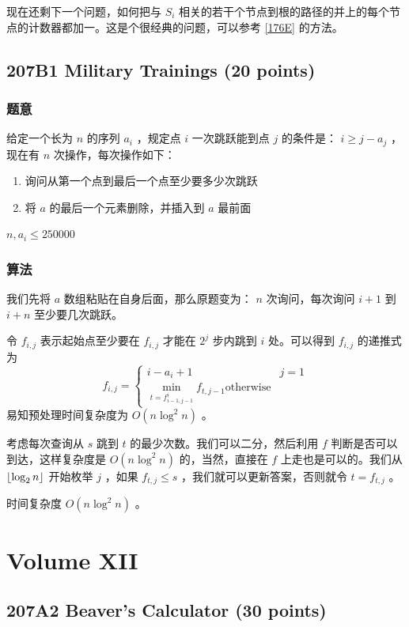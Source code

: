 \documentclass[11pt]{article}
\begin{document}
    现在还剩下一个问题，如何把与 $S_i$ 相关的若干个节点到根的路径的并上的每个节点的计数器都加一。这是个很经典的问题，可以参考 \ref{176E} 的方法。
\subsection{207B1 Military Trainings (20 points)}
\label{sec-11-9}
\subsubsection{题意}
\label{sec-11-9-1}

给定一个长为 $n$ 的序列 $a_i$ ，规定点 $i$ 一次跳跃能到点 $j$ 的条件是： $i \geq j - a_j$ ，现在有 $n$ 次操作，每次操作如下：
\begin{enumerate}
\item 询问从第一个点到最后一个点至少要多少次跳跃
\item 将 $a$ 的最后一个元素删除，并插入到 $a$ 最前面
\end{enumerate}

$n, a_i \leq 250000$
\subsubsection{算法}
\label{sec-11-9-2}

我们先将 $a$ 数组粘贴在自身后面，那么原题变为： $n$ 次询问，每次询问 $i + 1$ 到 $i + n$ 至少要几次跳跃。

令 $f_{i, j}$ 表示起始点至少要在 $f_{i, j}$ 才能在 $2^j$ 步内跳到 $i$ 处。可以得到 $f_{i, j}$ 的递推式为
$$f_{i, j} = \begin{cases} i - a_i + 1 & j = 1 \\ \min_{t = f_{i - 1, j - 1}^i} f_{t, j - 1} \text{otherwise} \end{cases}$$
易知预处理时间复杂度为 $O(n \log^2 n)$ 。

考虑每次查询从 $s$ 跳到 $t$ 的最少次数。我们可以二分，然后利用 $f$ 判断是否可以到达，这样复杂度是 $O(n \log^2 n)$ 的，当然，直接在 $f$ 上走也是可以的。我们从 ${\lfloor \log_2 n \rfloor}$ 开始枚举 $j$ ，如果 $f_{t, j} \leq s$ ，我们就可以更新答案，否则就令 $t = f_{t, j}$ 。

时间复杂度 $O(n \log^2 n)$ 。
\section{Volume XII}
\label{sec-12}
\subsection{207A2 Beaver's Calculator (30 points)}
\label{sec-12-1}
\end{document}
